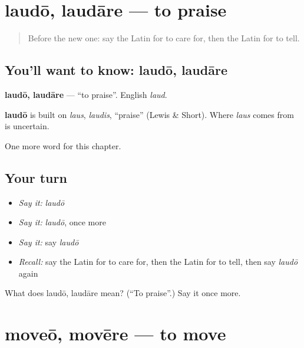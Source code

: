 \section[laudō, laudāre]{laudō, laudāre — to praise}

\label{lesson:LA-C99-laudo}



\begin{quote}
Before the new one: say the Latin for to care for, then the Latin for to tell.
\end{quote}

\subsection*{You'll want to know: laudō, laudāre}
\textbf{laudō, laudāre} — \textquotedblleft{}to praise\textquotedblright{}. English \emph{laud}.

\begin{cousinweb}
\textbf{laudō} is built on \emph{laus}, \emph{laudis}, \textquotedblleft{}praise\textquotedblright{} (Lewis \& Short). Where \emph{laus} comes from is uncertain.
\end{cousinweb}

\begin{grammarlens}[title={What you've built}]
One more word for this chapter.
\end{grammarlens}

\subsection*{Your turn}
\begin{itemize}
\raggedright
  \item \emph{Say it:} \emph{laudō}
  \item \emph{Say it:} \emph{laudō}, once more
  \item \emph{Say it:} say \emph{laudō}
  \item \emph{Recall:} say the Latin for to care for, then the Latin for to tell, then say \emph{laudō} again
\end{itemize}

\begin{tcolorbox}[breakable,colback=teal!4,colframe=teal!35!black,title={Before you move on}]
What does laudō, laudāre mean? (\textquotedblleft{}To praise\textquotedblright{}.) Say it once more.
\end{tcolorbox}
\section[moveō, movēre]{moveō, movēre — to move}

